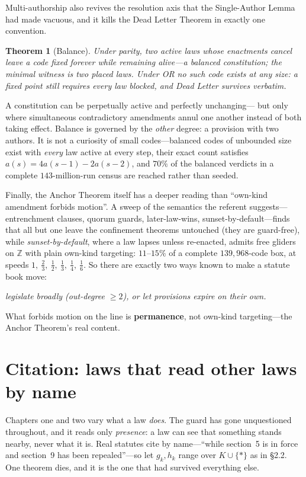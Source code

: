 \documentclass[10pt]{article}
\newtheorem{theorem}{Theorem}
\theoremstyle{definition}
\theoremstyle{remark}
\begin{document}
Multi-authorship also revives the resolution axis that the Single-Author Lemma
had made vacuous, and it kills the Dead Letter Theorem in exactly one
convention.
\begin{theorem}[Balance]
Under parity, two active laws whose enactments cancel leave a code fixed
forever while remaining alive---a \emph{balanced constitution}; the minimal
witness is two placed laws. Under OR no such code exists at any size: a fixed
point still requires every law blocked, and Dead Letter survives verbatim.
\end{theorem}
\noindent A constitution can be perpetually active and perfectly unchanging---
but only where simultaneous contradictory amendments annul one another instead
of both taking effect. Balance is governed by the \emph{other} degree: a
provision with two authors. It is not a curiosity of small codes---balanced
codes of unbounded size exist with \emph{every} law active at every step, their
exact count satisfies $a(s)=4a(s-1)-2a(s-2)$, and $70\%$ of the balanced
verdicts in a complete $143$-million-run census are reached rather than seeded.

Finally, the Anchor Theorem itself has a deeper reading than ``own-kind
amendment forbids motion''. A sweep of the semantics the referent
suggests---entrenchment clauses, quorum guards, later-law-wins,
sunset-by-default---finds that all but one leave the confinement theorems
untouched (they are guard-free), while \emph{sunset-by-default}, where a law
lapses unless re-enacted, admits free gliders on $\mathbb{Z}$ with plain
own-kind targeting: $11$--$15\%$ of a complete $139{,}968$-code box, at speeds
$1,\ \frac23,\ \frac12,\ \frac13,\ \frac14,\ \frac16$. So there are exactly two
ways known to make a statute book move:
\begin{center}
\emph{legislate broadly (out-degree $\ge2$), or let provisions expire on their
own.}
\end{center}
\noindent What forbids motion on the line is \textbf{permanence}, not own-kind
targeting---the Anchor Theorem's real content.

\section{Citation: laws that read other laws by name}
Chapters one and two vary what a law \emph{does}. The guard has gone
unquestioned throughout, and it reads only \emph{presence}: a law can see that
something stands nearby, never what it is. Real statutes cite by name---``while
section~5 is in force and section~9 has been repealed''---so let $g_k,h_k$ range
over $K\cup\{\ast\}$ as in \S2.2. One theorem dies, and it is the one that had
survived everything else.
\end{document}
